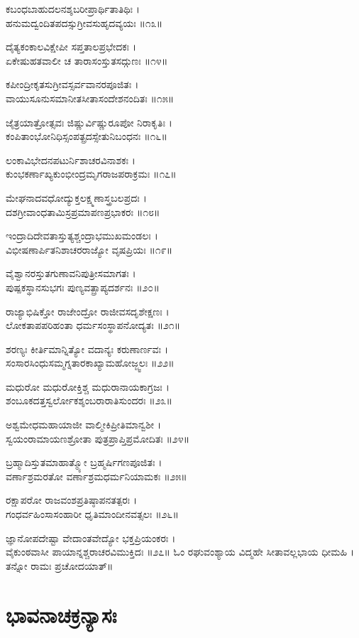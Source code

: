ಕಬಂಧಬಾಹುದಲನಶ್ಶಬರೀಪ್ರಾರ್ಥಿತಾತಿಥಿಃ ।\\
ಹನುಮದ್ವಂದಿತಪದಸ್ಸುಗ್ರೀವಸುಹೃದವ್ಯಯಃ ॥೧೩॥

ದೈತ್ಯಕಂಕಾಲವಿಕ್ಷೇಪೀ ಸಪ್ತತಾಲಪ್ರಭೇದಕಃ ।\\
ಏಕೇಷುಹತವಾಲೀ ಚ ತಾರಾಸಂಸ್ತುತಸದ್ಗುಣಃ ॥೧೪॥

ಕಪೀಂದ್ರೀಕೃತಸುಗ್ರೀವಸ್ಸರ್ವವಾನರಪೂಜಿತಃ ।\\
ವಾಯುಸೂನುಸಮಾನೀತಸೀತಾಸಂದೇಶನಂದಿತಃ ॥೧೫॥

ಜೈತ್ರಯಾತ್ರೋತ್ಸವಃ ಜಿಷ್ಣುರ್ವಿಷ್ಣುರೂಪೋ ನಿರಾಕೃತಿಃ ।\\
ಕಂಪಿತಾಂಭೋನಿಧಿಸ್ಸಂಪತ್ಪ್ರದಸ್ಸೇತುನಿಬಂಧನಃ ॥೧೬॥

ಲಂಕಾವಿಭೇದನಪಟುರ್ನಿಶಾಚರವಿನಾಶಕಃ ।\\
ಕುಂಭಕರ್ಣಾಖ್ಯಕುಂಭೀಂದ್ರಮೃಗರಾಜಪರಾಕ್ರಮಃ ॥೧೭॥

ಮೇಘನಾದವಧೋದ್ಯುಕ್ತಲಕ್ಷ್ಮಣಾಸ್ತ್ರಬಲಪ್ರದಃ ।\\
ದಶಗ್ರೀವಾಂಧತಾಮಿಸ್ರಪ್ರಮಾಪಣಪ್ರಭಾಕರಃ ॥೧೮॥

ಇಂದ್ರಾದಿದೇವತಾಸ್ತುತ್ಯಶ್ಚಂದ್ರಾಭಮುಖಮಂಡಲಃ ।\\
ವಿಭೀಷಣಾರ್ಪಿತನಿಶಾಚರರಾಜ್ಯೋ ವೃಷಪ್ರಿಯಃ ॥೧೯॥

ವೈಶ್ವಾನರಸ್ತುತಗುಣಾವನಿಪುತ್ರೀಸಮಾಗತಃ ।\\
ಪುಷ್ಪಕಸ್ಥಾನಸುಭಗಃ ಪುಣ್ಯವತ್ಪ್ರಾಪ್ಯದರ್ಶನಃ ॥೨೦॥

ರಾಜ್ಯಾಭಿಷಿಕ್ತೋ ರಾಜೇಂದ್ರೋ ರಾಜೀವಸದೃಶೇಕ್ಷಣಃ ।\\
ಲೋಕತಾಪಪರಿಹಂತಾ ಧರ್ಮಸಂಸ್ಥಾಪನೋದ್ಯತಃ ॥೨೧॥

ಶರಣ್ಯಃ ಕೀರ್ತಿಮಾನ್ನಿತ್ಯೋ ವದಾನ್ಯಃ ಕರುಣಾರ್ಣವಃ ।\\
ಸಂಸಾರಸಿಂಧುಸಮ್ಮಗ್ನತಾರಕಾಖ್ಯಾಮಹೋಜ್ಜ್ವಲಃ ॥೨೨॥

ಮಧುರೋ ಮಧುರೋಕ್ತಿಶ್ಚ ಮಧುರಾನಾಯಕಾಗ್ರಜಃ ।\\
ಶಂಬೂಕದತ್ತಸ್ವರ್ಲೋಕಶ್ಶಂಬರಾರಾತಿಸುಂದರಃ ॥೨೩॥

ಅಶ್ವಮೇಧಮಹಾಯಾಜೀ ವಾಲ್ಮೀಕಿಪ್ರೀತಿಮಾನ್ವಶೀ ।\\
ಸ್ವಯಂರಾಮಾಯಣಶ್ರೋತಾ ಪುತ್ರಪ್ರಾಪ್ತಿಪ್ರಮೋದಿತಃ ॥೨೪॥

ಬ್ರಹ್ಮಾದಿಸ್ತುತಮಾಹಾತ್ಮ್ಯೋ ಬ್ರಹ್ಮರ್ಷಿಗಣಪೂಜಿತಃ ।\\
ವರ್ಣಾಶ್ರಮರತೋ ವರ್ಣಾಶ್ರಮಧರ್ಮನಿಯಾಮಕಃ ॥೨೫॥

ರಕ್ಷಾಪರೋ ರಾಜವಂಶಪ್ರತಿಷ್ಠಾಪನತತ್ಪರಃ ।\\
ಗಂಧರ್ವಹಿಂಸಾಸಂಹಾರೀ ಧೃತಿಮಾಂದೀನವತ್ಸಲಃ ॥೨೬॥

ಜ್ಞಾನೋಪದೇಷ್ಟಾ ವೇದಾಂತವೇದ್ಯೋ ಭಕ್ತಪ್ರಿಯಂಕರಃ ।\\
ವೈಕುಂಠವಾಸೀ ಪಾಯಾನ್ನಶ್ಚರಾಚರವಿಮುಕ್ತಿದಃ ॥೨೭॥
ಓಂ ರಘುವಂಶ್ಯಾಯ ವಿದ್ಮಹೇ ಸೀತಾವಲ್ಲಭಾಯ ಧೀಮಹಿ । ತನ್ನೋ ರಾಮಃ ಪ್ರಚೋದಯಾತ್॥
\chapter*{\center ಭಾವನಾಚಕ್ರನ್ಯಾಸಃ}
\thispagestyle{empty}
